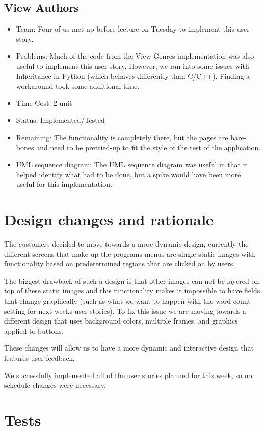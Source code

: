 \documentclass[12pt]{article}
\begin{document}
\subsection{View Authors}
\begin{itemize}
\item Team: Four of us met up before lecture on Tuesday to implement this user story.
\item Problems: Much of the code from the View Genres implementation was also useful to implement this user story. However, we ran into some issues with Inheritance in Python (which behaves differently than C/C++). Finding a workaround took some additional time.
\item Time Cost: 2 unit 
\item Status: Implemented/Tested
\item Remaining: The functionality is completely there, but the pages are bare-bones and need to be prettied-up to fit the style of the rest of the application.
\item UML sequence diagram: The  UML sequence diagram was useful in that it helped identify what had to be done, but a spike would have been more useful for this implementation.
\end{itemize}

\section{Design changes and rationale}

The customers decided to move towards a more dynamic design, currently the different screens that make up the programs menus
are single static images with functionality based on predetermined regions that are clicked on by users. 

The biggest drawback of such a design is that other images can not be layered on top of these static images and this functionality makes it impossible to have fields that change graphically (such as what we want to happen with the word count setting for next weeks user stories). To fix this issue we are moving towards a different design that uses background colors, multiple frames, and graphics applied to buttons. 

These changes will allow us to have a more dynamic and interactive design that features user feedback.

We successfully implemented all of the user stories planned for this week, so no schedule changes were necessary. 

\section{Tests}
\end{document}

